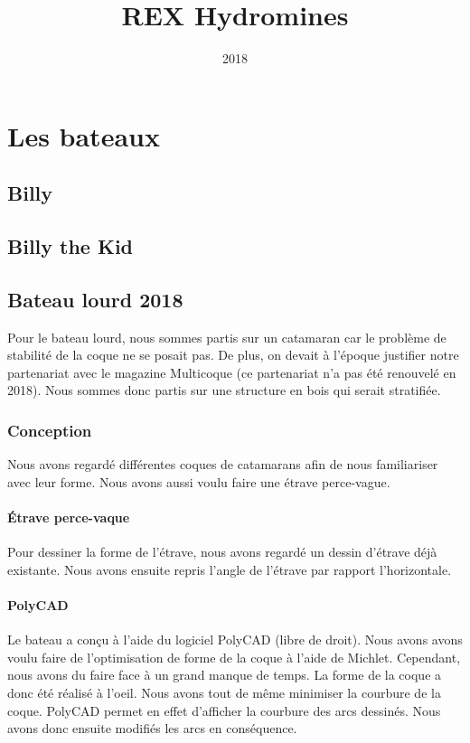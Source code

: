 \documentclass[a4paper, 11pt]{report}
\title{REX Hydromines}
\date{2018}
\begin{document}
\maketitle

\tableofcontents

\part{Les bateaux}

\chapter{Billy}

\chapter{Billy the Kid}

\chapter{Bateau lourd 2018}
Pour le bateau lourd, nous sommes partis sur un catamaran car le problème de stabilité de la coque ne se posait pas. De plus, on devait à l'époque justifier notre partenariat avec le magazine Multicoque (ce partenariat n'a pas été renouvelé en 2018). Nous sommes donc partis sur une structure en bois qui serait stratifiée.

\section{Conception}
Nous avons regardé différentes coques de catamarans afin de nous familiariser avec leur forme. Nous avons aussi voulu faire une étrave perce-vague.

\subsection{Étrave perce-vaque}
Pour dessiner la forme de l'étrave, nous avons regardé un dessin d'étrave déjà existante. Nous avons ensuite repris l'angle de l'étrave par rapport  l'horizontale.

\subsection{PolyCAD}
Le bateau a conçu à l'aide du logiciel PolyCAD (libre de droit). Nous avons avons voulu faire de l'optimisation de forme de la coque à l'aide de Michlet. Cependant, nous avons du faire face à un grand manque de temps. La forme de la coque a donc été réalisé à l'oeil. Nous avons tout de même minimiser la courbure de la coque. PolyCAD permet en effet d'afficher la courbure des arcs dessinés. Nous avons donc ensuite modifiés les arcs en conséquence.
\end{document}
